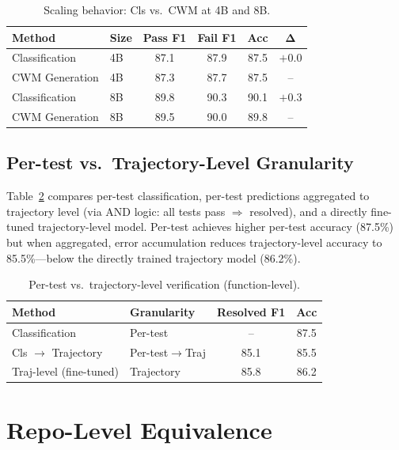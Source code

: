 \documentclass[11pt,a4paper]{article}
\begin{document}
\begin{table}[t]
\centering
\small
\caption{Scaling behavior: Cls vs.\ CWM at 4B and 8B.}
\label{tab:scaling}
\begin{tabular}{llcccc}
\toprule
\textbf{Method} & \textbf{Size} & \textbf{Pass F1} & \textbf{Fail F1} & \textbf{Acc} & $\boldsymbol{\Delta}$ \\
\midrule
Classification & 4B & 87.1 & 87.9 & 87.5 & $+$0.0 \\
CWM Generation & 4B & 87.3 & 87.7 & 87.5 & -- \\
Classification & 8B & 89.8 & 90.3 & 90.1 & $+$0.3 \\
CWM Generation & 8B & 89.5 & 90.0 & 89.8 & -- \\
\bottomrule
\end{tabular}
\end{table}

\subsection{Per-test vs.\ Trajectory-Level Granularity}

Table~\ref{tab:traj} compares per-test classification, per-test predictions aggregated to trajectory level (via AND logic: all tests pass $\Rightarrow$ resolved), and a directly fine-tuned trajectory-level model.
Per-test achieves higher per-test accuracy (87.5\%) but when aggregated, error accumulation reduces trajectory-level accuracy to 85.5\%---below the directly trained trajectory model (86.2\%).

\begin{table}[t]
\centering
\small
\caption{Per-test vs.\ trajectory-level verification (function-level).}
\label{tab:traj}
\begin{tabular}{llcc}
\toprule
\textbf{Method} & \textbf{Granularity} & \textbf{Resolved F1} & \textbf{Acc} \\
\midrule
Classification & Per-test & -- & 87.5 \\
Cls $\rightarrow$ Trajectory & Per-test$\rightarrow$Traj & 85.1 & 85.5 \\
Traj-level (fine-tuned) & Trajectory & 85.8 & 86.2 \\
\bottomrule
\end{tabular}
\end{table}

\section{Repo-Level Equivalence}
\label{sec:repo}
\end{document}

